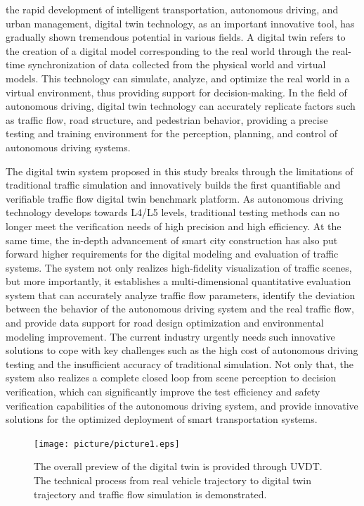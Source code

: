 \documentclass[journal,twoside,web]{ieeecolor}
\begin{document}
 the rapid development of intelligent transportation, autonomous driving, and urban management, digital twin technology, as an important innovative tool, has gradually shown tremendous potential in various fields\cite{Alpher17}. 
A digital twin refers to the creation of a digital model corresponding to the real world through the real-time synchronization of data collected from the physical world and virtual models\cite{Alpher20c}. 
This technology can simulate, analyze, and optimize the real world in a virtual environment, thus providing support for decision-making\cite{Alpher21b}. 
In the field of autonomous driving, digital twin technology can accurately replicate factors such as traffic flow, road structure, and pedestrian behavior, providing a precise testing and training environment for the perception, planning, and control of autonomous driving systems\cite{Alpher24}\cite{Alpher20d}.

The digital twin system proposed in this study breaks through the limitations of traditional traffic simulation and innovatively builds the first quantifiable and verifiable traffic flow digital twin benchmark platform.
As autonomous driving technology develops towards L4/L5 levels, traditional testing methods can no longer meet the verification needs of high precision and high efficiency\cite{Alpher24b}.
At the same time, the in-depth advancement of smart city construction has also put forward higher requirements for the digital modeling and evaluation of traffic systems.
The system not only realizes high-fidelity visualization of traffic scenes, but more importantly, it establishes a multi-dimensional quantitative evaluation system that can accurately analyze traffic flow parameters, identify the deviation between the behavior of the autonomous driving system and the real traffic flow, and provide data support for road design optimization and environmental modeling improvement.
The current industry urgently needs such innovative solutions to cope with key challenges such as the high cost of autonomous driving testing and the insufficient accuracy of traditional simulation\cite{Alpher22c}.
Not only that, the system also realizes a complete closed loop from scene perception to decision verification, which can significantly improve the test efficiency and safety verification capabilities of the autonomous driving system, and provide innovative solutions for the optimized deployment of smart transportation systems\cite{Alpher17b}.

\begin{figure}[!t]
	\centerline{\texttt{[image: picture/picture1.eps]}}
	\caption{The overall preview of the digital twin is provided through UVDT. The technical process from real vehicle trajectory to digital twin trajectory and traffic flow simulation is demonstrated.}
	\label{fig1}
\end{figure}
\end{document}
